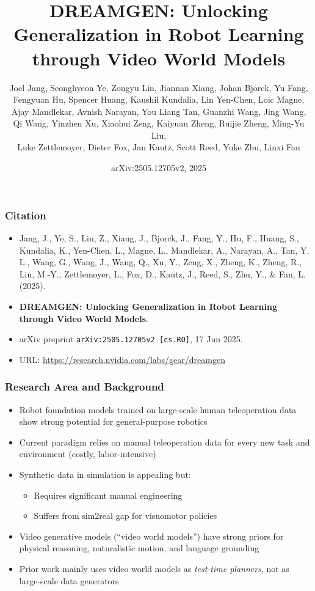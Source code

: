 \documentclass{beamer}
\title[DREAMGEN]{DREAMGEN: Unlocking Generalization in Robot Learning through Video World Models}
\author[Jang et al.]{Joel Jang, Seonghyeon Ye, Zongyu Lin, Jiannan Xiang, Johan Bjorck, Yu Fang,\\
Fengyuan Hu, Spencer Huang, Kaushil Kundalia, Lin Yen-Chen, Loic Magne,\\
Ajay Mandlekar, Avnish Narayan, You Liang Tan, Guanzhi Wang, Jing Wang,\\
Qi Wang, Yinzhen Xu, Xiaohui Zeng, Kaiyuan Zheng, Ruijie Zheng, Ming-Yu Liu,\\
Luke Zettlemoyer, Dieter Fox, Jan Kautz, Scott Reed, Yuke Zhu, Linxi Fan}
\institute[NVIDIA et al.]{
NVIDIA \and University of Washington \and KAIST \and UCLA \and UCSD \and CalTech \and NTU \and University of Maryland \and UT Austin}
\date{arXiv:2505.12705v2, 2025}
\begin{document}
\begin{frame}
  \titlepage
\end{frame}

\begin{frame}
  \frametitle{Citation}
  \small
  \begin{itemize}
    \item Jang, J., Ye, S., Lin, Z., Xiang, J., Bjorck, J., Fang, Y., Hu, F., Huang, S., Kundalia, K., Yen-Chen, L., Magne, L., Mandlekar, A., Narayan, A., Tan, Y. L., Wang, G., Wang, J., Wang, Q., Xu, Y., Zeng, X., Zheng, K., Zheng, R., Liu, M.-Y., Zettlemoyer, L., Fox, D., Kautz, J., Reed, S., Zhu, Y., \& Fan, L. (2025).
    \item \textbf{DREAMGEN: Unlocking Generalization in Robot Learning through Video World Models}.
    \item arXiv preprint \texttt{arXiv:2505.12705v2 [cs.RO]}, 17 Jun 2025.
    \item URL: \url{https://research.nvidia.com/labs/gear/dreamgen}
  \end{itemize}
\end{frame}

\begin{frame}
  \frametitle{Research Area and Background}
  \small
  \begin{itemize}
    \item Robot foundation models trained on large-scale human teleoperation data show strong potential for general-purpose robotics \cite[Sec. 1]{}
    \item Current paradigm relies on manual teleoperation data for every new task and environment (costly, labor-intensive)
    \item Synthetic data in simulation is appealing but:
      \begin{itemize}
        \item Requires significant manual engineering
        \item Suffers from sim2real gap for visuomotor policies
      \end{itemize}
    \item Video generative models (``video world models'') have strong priors for physical reasoning, naturalistic motion, and language grounding
    \item Prior work mainly uses video world models as \emph{test-time planners}, not as large-scale data generators
  \end{itemize}
\end{frame}
\end{document}
